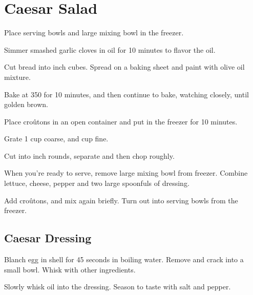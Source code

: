 \section{Caesar Salad}
\begin{recipe}

Place serving bowls and large mixing bowl in the freezer.


Simmer smashed garlic cloves in oil for 10 minutes to flavor the oil.

Cut bread into  inch cubes. Spread on a baking sheet and paint with olive oil mixture.

Bake at 350\degree{} for 10 minutes, and then continue to bake, watching closely, until golden brown.

Place croûtons in an open container and put in the freezer for 10 minutes.


Grate 1 cup coarse, and  cup fine.


Cut into  inch rounds, separate and then chop roughly.


When you're ready to serve, remove large mixing bowl from freezer. Combine lettuce, cheese, pepper and two large spoonfuls of dressing.

Add croûtons, and mix again briefly. Turn out into serving bowls from the freezer.

\subsection{Caesar Dressing}


Blanch egg in shell for 45 seconds in boiling water. Remove and crack into a small bowl. Whisk with other ingredients.


Slowly whisk oil into the dressing. Season to taste with salt and pepper.

\end{recipe}
